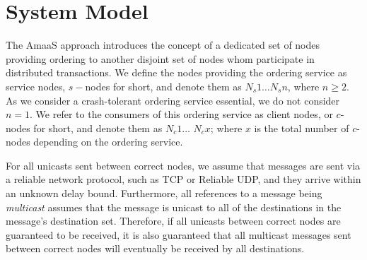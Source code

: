 %		

\section{System Model}	
	The \textsf{AmaaS} approach introduces the concept of a dedicated set of nodes providing ordering to another disjoint set of nodes whom participate in distributed transactions.  We define the nodes providing the ordering service as service nodes, $s-$nodes for short, and denote them as $N_s1 \ldots N_sn$, where $n \geq 2$.  As we consider a crash-tolerant ordering service essential, we do not consider $n = 1$.  We refer to the consumers of this ordering service as client nodes, or $c$-nodes for short, and denote them as $N_c1 \ldots$ $N_cx$; where $x$ is the total number of $c$-nodes depending on the ordering service.  
		
    For all unicasts sent between correct nodes, we assume that messages are sent via a reliable network protocol, such as TCP\citep{Cerf:2005:PPN:1064413.1064423} or Reliable UDP\citep{ReliableUDP}, and they arrive within an unknown delay bound.   Furthermore, all references to a message being \emph{multicast} assumes that the message is unicast to all of the destinations in the message's destination set.  Therefore, if all unicasts between correct nodes are guaranteed to be received, it is also guaranteed that all multicast messages sent between correct nodes will eventually be received by all destinations.  
		
